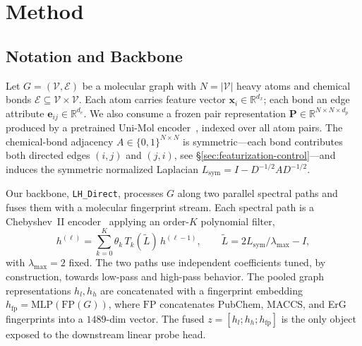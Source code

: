 
\section{Method}
\label{sec:method}

\subsection{Notation and Backbone}
\label{sec:notation}
Let $G=(\mathcal{V},\mathcal{E})$ be a molecular graph with $N=|\mathcal{V}|$
heavy atoms and chemical bonds $\mathcal{E}\subseteq\mathcal{V}\times\mathcal{V}$.
Each atom carries feature vector $\mathbf{x}_i\in\mathbb{R}^{d_x}$;
each bond an edge attribute $\mathbf{e}_{ij}\in\mathbb{R}^{d_e}$. We also
consume a frozen pair representation
$\mathbf{P}\in\mathbb{R}^{N\times N\times d_p}$ produced by a pretrained
Uni-Mol encoder~\cite{zhou2023unimol}, indexed over all atom pairs. The
chemical-bond adjacency $A\in\{0,1\}^{N\times N}$ is symmetric---each bond
contributes both directed edges $(i,j)$ and $(j,i)$, see
\S\ref{sec:featurization-control}---and induces the symmetric normalized
Laplacian $L_{\mathrm{sym}}=I-D^{-1/2}AD^{-1/2}$.

Our backbone, \texttt{LH\_Direct}, processes $G$ along two parallel
spectral paths and fuses them with a molecular fingerprint stream. Each
spectral path is a Chebyshev~II encoder~\cite{he2022chebnetii} applying an
order-$K$ polynomial filter,
\begin{equation}
    h^{(\ell)} = \sum_{k=0}^{K} \theta_k\, T_k(\tilde L)\, h^{(\ell-1)},
    \qquad \tilde L = 2L_{\mathrm{sym}}/\lambda_{\max} - I,
    \label{eq:chebnetii}
\end{equation}
with $\lambda_{\max}{=}2$ fixed. The two paths use independent coefficients
tuned, by construction, towards low-pass and high-pass behavior. The pooled
graph representations $h_l, h_h$ are concatenated with a fingerprint
embedding $h_{\mathrm{fp}}=\mathrm{MLP}(\mathrm{FP}(G))$, where $\mathrm{FP}$
concatenates PubChem, MACCS, and ErG fingerprints into a $1489$-dim vector.
The fused $z = [h_l; h_h; h_{\mathrm{fp}}]$ is the only object exposed to the
downstream linear probe head.

